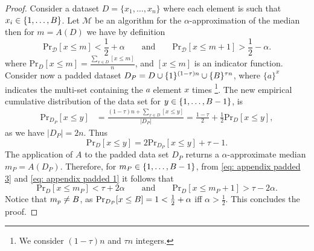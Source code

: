 \begin{proof}
    Consider a dataset $D=\{x_1, \dots, x_n\}$ where each element is such that $x_i \in \{1,\dots,B\}$. Let $\mathcal{M}$ be an algorithm for the $\alpha$-approximation of the median then for $m = A(D)$ we have by definition
     \begin{equation}
     \label{eq: appendix padded 1}
        \text{Pr}_{\mathcal{D}}[x\leq m]<\frac{1}{2}+\alpha \qquad \text{and} \qquad \text{Pr}_{\mathcal{D}}[x\leq m+1]>\frac{1}{2}-\alpha.
    \end{equation}
    where $\text{Pr}_{D}[x\leq m] = \frac{\sum_{x\in D}[x\leq m]}{n}$, and $[x\leq m]$ is an indicator function. 
    Consider now a padded dataset $D_P = D\cup \{1\}^{(1-\tau)n} \cup \{B\}^{\tau n}$, where $\{a\}^{x}$ indicates the multi-set containing the $a$ element $x$ times \footnote{We consider $(1-\tau)n$ and $\tau n$ integers.}. The new empirical cumulative distribution of the data set for $y \in \{1, \dots, B-1\}$, is \begin{align*}
    \label{eq: appendix padded 2}
        \text{Pr}_{D_P}[x\leq y] &= \frac{(1-\tau)n +\sum_{x\in D}[x\leq y]}{|D_P|} = \frac{1-\tau}{2}+\frac{1}{2}\text{Pr}_{D}[x\leq y],
    \end{align*}
    as we have $|D_P| = 2n$. Thus 
    \begin{equation}
    \label{eq: appendix padded 3}
        \text{Pr}_{D}[x\leq y] = 2\text{Pr}_{D_P}[x\leq y] +\tau -1.
    \end{equation}
    The application of $A$ to the padded data set $D_{P}$ returns a $\alpha$-approximate median $m_P = A(D_P)$. Therefore, for $m_P\in\{1,\dots, B-1\}$, from \autoref{eq: appendix padded 3} and \autoref{eq: appendix padded 1} it follows that 
    \begin{equation}
    \label{eq: appendix padded 4}
       \text{Pr}_{D}[x\leq m_P]<\tau+2\alpha \qquad \text{and} \qquad \text{Pr}_{D}[x\leq m_P+1]>\tau-2\alpha.
    \end{equation}
    Notice that $m_p\neq B$, as $\text{Pr}_{D_P}[x\leq B]=1<\frac{1}{2}+\alpha$ iff $\alpha>\frac{1}{2}$. This concludes the proof.
\end{proof}

%
%
%
%
%
%
%
